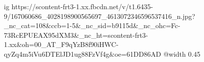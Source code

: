  
 
 
 
 

\ifcmt
  ig https://scontent-frt3-1.xx.fbcdn.net/v/t1.6435-9/167060686_4028198900565697_4613072346596537416_n.jpg?_nc_cat=108&ccb=1-5&_nc_sid=b9115d&_nc_ohc=Fc-73RcEPUEAX95dXM3&_nc_ht=scontent-frt3-1.xx&oh=00_AT_F9qYzB8f90iHWC-qyZq4m5iVu6DTElJD1ug88FzVf4g&oe=61DD86AD
  @width 0.45
\fi
